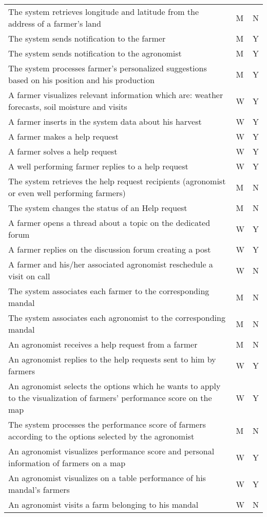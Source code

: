 \begin{center}
\begin{longtable}{ |m{7cm}|C{2.3cm}|C{1.6cm}|}
The system retrieves longitude and latitude from the address of a farmer's land & M & N\\
The system sends notification to the farmer & M & Y\\
The system sends notification to the agronomist & M & Y\\
The system processes farmer's personalized suggestions based on his position and his production & M & Y\\
A farmer visualizes relevant information which are: weather forecasts, soil moisture and visits & W & Y\\
A farmer inserts in the system data about his harvest & W & Y\\
A farmer makes a help request & W & Y\\
A farmer solves a help request & W & Y\\
A well performing farmer replies to a help request & W & Y\\
The system retrieves the help request recipients (agronomist or even well performing farmers) & M & N\\
The system changes the status of an Help request & M & N\\
A farmer opens a thread about a topic on the dedicated forum & W & Y\\
A farmer replies on the discussion forum creating a post & W & Y\\
A farmer and his/her associated agronomist reschedule a visit on call & W & N\\
The system associates each farmer to the corresponding mandal & M & N\\
The system associates each agronomist to the corresponding mandal & M & N\\
An agronomist receives a help request from a farmer & M & N\\
An agronomist replies to the help requests sent to him by farmers & W & Y\\
An agronomist selects the options which he wants to apply to the visualization of farmers' performance score on the map & W & Y\\
The system processes the performance score of farmers according to the options selected by the agronomist & M & N\\
An agronomist visualizes performance score and personal information of farmers on a map & W & Y\\
An agronomist visualizes on a table performance of his mandal's farmers & W & Y\\
An agronomist visits a farm belonging to his mandal & W & N\\

\end{longtable}
\end{center}
